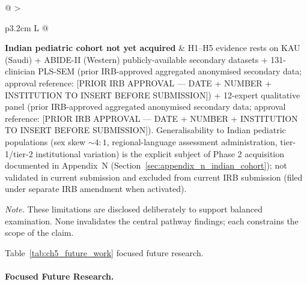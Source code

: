 {\begin{xltabular}{\textwidth}{@{} >{\raggedright\arraybackslash}p{3.2cm} L @{}}
\textbf{Indian pediatric cohort not yet acquired} & H1--H5 evidence rests on KAU (Saudi) + ABIDE-II (Western) publicly-available secondary datasets + 131-clinician PLS-SEM (prior IRB-approved aggregated anonymised secondary data; approval reference: [PRIOR IRB APPROVAL --- DATE + NUMBER + INSTITUTION TO INSERT BEFORE SUBMISSION]) + 12-expert qualitative panel (prior IRB-approved aggregated anonymised secondary data; approval reference: [PRIOR IRB APPROVAL --- DATE + NUMBER + INSTITUTION TO INSERT BEFORE SUBMISSION]). Generalisability to Indian pediatric populations (sex skew $\sim 4:1$, regional-language assessment administration, tier-1/tier-2 institutional variation) is the explicit subject of Phase 2 acquisition documented in Appendix~N (Section~\ref{sec:appendix_n_indian_cohort}); not validated in current submission and excluded from current IRB submission (filed under separate IRB amendment when activated). \\
\end{xltabular}}
\vspace{0.4em}
\noindent\textit{Note.} These limitations are disclosed deliberately to support balanced examination. None invalidates the central pathway findings; each constrains the scope of the claim.

\noindent Table~\ref{tab:ch5_future_work} focused future research.

\paragraph{Focused Future Research.}




